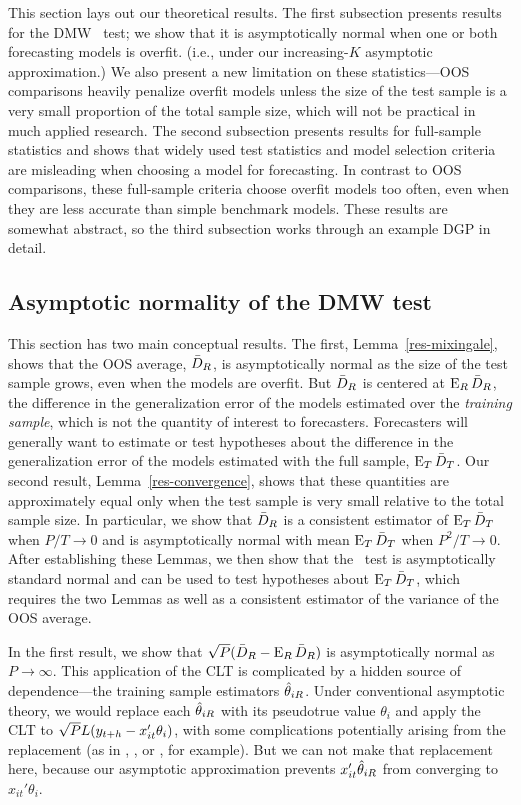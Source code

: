 \documentclass[12pt]{article}
\begin{document}
This section lays out our theoretical results. The first subsection
presents results for the DMW \oost\ test; we show that it is
asymptotically normal when one or both forecasting models is overfit.
(i.e., under our increasing-$K$ asymptotic approximation.) We also
present a new limitation on these statistics---OOS comparisons heavily
penalize overfit models unless the size of the test sample is a very
small proportion of the total sample size, which will not be practical
in much applied research. The second subsection presents results for
full-sample statistics and shows that widely used test statistics and
model selection criteria are misleading when choosing a model for
forecasting. In contrast to OOS comparisons, these full-sample
criteria choose overfit models too often, even when they are less
accurate than simple benchmark models. These results are somewhat
abstract, so the third subsection works through an example DGP in
detail.

\subsection{Asymptotic normality of the DMW test}
\label{sec:oostheory}

This section has two main conceptual results. The first,
Lemma~\ref{res-mixingale}, shows that the OOS average, $\bar{D}_{R}$, is
asymptotically normal as the size of the test sample grows, even when
the models are overfit. But $\bar{D}_{R}$ is centered at $\operatorname{E}_R \bar{D}_{R}$, the
difference in the generalization error of the models estimated over
the \emph{training sample}, which is not the quantity of interest to
forecasters. Forecasters will generally want to estimate or test
hypotheses about the difference in the generalization error of the
models estimated with the full sample, $\operatorname{E}_T \bar{D}_{T}$. Our second
result, Lemma~\ref{res-convergence}, shows that these quantities are
approximately equal only when the test sample is very small relative
to the total sample size. In particular, we show that $\bar{D}_{R}$ is a
consistent estimator of $\operatorname{E}_T \bar{D}_{T}$ when $P/T \to 0$ and is
asymptotically normal with mean $\operatorname{E}_T \bar{D}_{T}$ when $P^2/T \to 0$. After
establishing these Lemmas, we then show that the \oost\ test is
asymptotically standard normal and can be used to test hypotheses
about $\operatorname{E}_T \bar{D}_{T}$, which requires the two Lemmas as well as a
consistent estimator of the variance of the OOS average.

In the first result, we show that
$\sqrt{P} (\bar{D}_{R} - \operatorname{E}_R \bar{D}_{R})$ is asymptotically normal as $P \to
\infty$. This application of the CLT is complicated by a hidden source
of dependence---the training sample estimators $\hat\theta_{iR}$. Under
conventional asymptotic theory, we would replace each $\hat\theta_{iR}$ with
its pseudotrue value $\theta_i$ and apply the CLT to $\sqrt{P}
L(y_{t+h} - x_{it}'\theta_i)$, with some complications potentially
arising from the replacement (as in \citealp{Wes:96},
\citealp{ClM:01}, or \citealp{Mcc:07}, for example). But we can not
make that replacement here, because our asymptotic approximation
prevents $x_{it}'\hat\theta_{iR}$ from converging to $x_{it}'\theta_i$.
\end{document}
